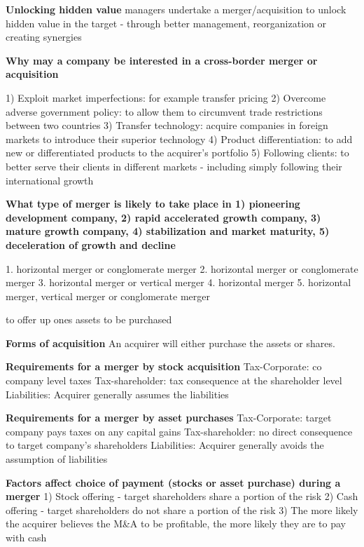 \documentclass[12pt]{article}
\begin{document}
			\textbf{Unlocking hidden value} managers undertake a merger/acquisition to unlock hidden value in the target - through better management, reorganization or creating synergies
			
			\textbf{Why may a company be interested in a cross-border merger or acquisition}
			
			1) Exploit market imperfections: for example transfer pricing 
			2) Overcome adverse government policy: to allow them to circumvent trade restrictions between two countries
			3) Transfer technology: acquire companies in foreign markets to introduce their superior technology
			4) Product differentiation: to add new or differentiated products to the acquirer's portfolio
			5) Following clients: to better serve their clients in different markets - including simply following their international growth
			
			\textbf{What type of merger is likely to take place in 1) pioneering development company, 2) rapid accelerated growth company, 3) mature growth company, 4) stabilization and market maturity, 5) deceleration of growth and decline}
			
			1.  horizontal merger or conglomerate merger
			2.  horizontal merger or conglomerate merger
			3.  horizontal merger or vertical merger
			4.  horizontal merger
			5. horizontal merger, vertical merger or conglomerate merger
			
			 to offer up ones assets to be purchased
			
			\textbf{Forms of acquisition} An acquirer will either purchase the assets or shares. 
			
			\textbf{Requirements for a merger by stock acquisition}
			Tax-Corporate: co company level taxes
			Tax-shareholder:  tax consequence at the shareholder level 
			Liabilities: Acquirer generally assumes the liabilities
			
			\textbf{Requirements for a merger by asset purchases}
			Tax-Corporate: target company pays taxes on any capital gains
			Tax-shareholder:  no direct consequence to target company's shareholders
			Liabilities: Acquirer generally avoids the assumption of liabilities
			
			\textbf{Factors affect choice of payment (stocks or asset purchase) during a merger}
			1) Stock offering - target shareholders share a portion of the risk
			2) Cash offering - target shareholders do not share a portion of the risk
			3) The more likely the acquirer believes the M\&A to be profitable, the more likely they are to pay with cash
			
\end{document}
